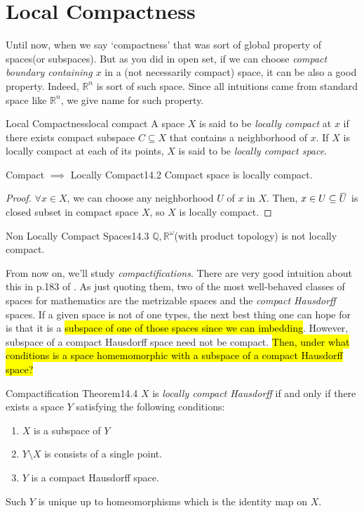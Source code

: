 \documentclass[12pt, a4paper, twoside]{article}
\newcommand{\overbar}[1]{\mkern 1.5mu\overline{\mkern-1.5mu#1\mkern-1.5mu}\mkern 1.5mu}
\newcommand{\BQ}{{\mathbb {Q}}} \newcommand{\BR}{{\mathbb {R}}}
\theoremstyle{plain}
\begin{document}
\newpage 

\section{Local Compactness}

Until now, when we say \lq compactness' that was sort of global property of spaces(or subspaces). 
But as you did in open set, if we can choose \textit{compact boundary containing $x$} in a (not necessarily compact) space, 
it can be also a good property. Indeed, $\BR^n$ is sort of such space. 
Since all intuitions came from standard space like $\BR^n$, we give name for such property. 

\begin{defn}{Local Compactness}{local compact}
    A space $X$ is said to be \textit{locally compact} at $x$ if there exists 
    compact subspace $C \subseteq X$ that contains a neighborhood of $x$. 
    If $X$ is locally compact at each of its points, $X$ is said to be \textit{locally compact space}. 
\end{defn}

\begin{rem}{Compact $\implies$ Locally Compact}{14.2}
    Compact space is locally compact. 
\end{rem}

\begin{proof}
    $\forall x \in X$, we can choose any neighborhood $U$ of $x$ in $X$. 
    Then, $x \in U \subseteq \overbar{U}$ is closed subset in compact space $X$, so $X$ is locally compact. 
\end{proof}

\begin{warn}{Non Locally Compact Spaces}{14.3}
    $\BQ, \BR^\omega$(with product topology) is not locally compact. 
\end{warn}

From now on, we'll study \textit{compactifications}. 
There are very good intuition about this in p.183 of \cite{munkres}. 
As just quoting them, two of the most well-behaved classes of spaces for mathematics are the 
metrizable spaces and the \textit{compact Hausdorff} spaces. 
If a given space is not of one types, the next best thing one can hope for is that 
it is a \hl{subspace of one of those spaces since we can imbedding}. 
However, subspace of a compact Hausdorff space need not be compact. \hl{Then, under what conditions is a space homemomorphic with a subspace of a compact Hausdorff space?}

\begin{thm}{Compactification Theorem}{14.4}
    $X$ is \textit{locally compact Hausdorff} if and only if there exists a space $Y$ satisfying the following conditions: 
    \begin{enumerate}
        \item $X$ is a subspace of $Y$
        \item $Y \setminus X$ is consists of a single point. 
        \item $Y$ is a compact Hausdorff space. 
    \end{enumerate}
    Such $Y$ is unique up to homeomorphisms which is the identity map on $X$. 
\end{thm}
\end{document}
